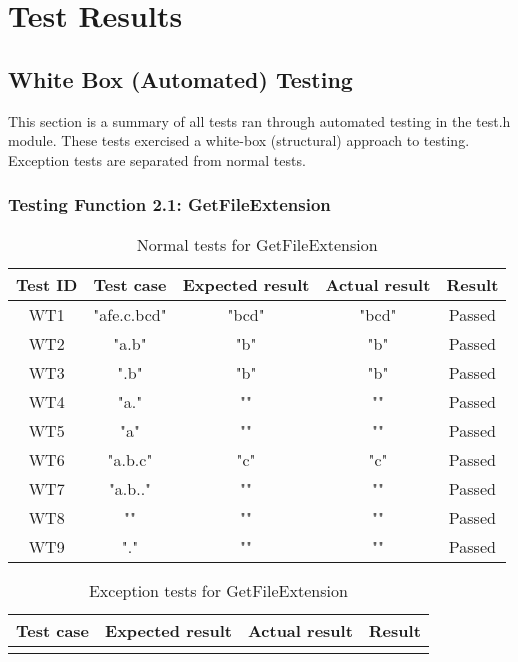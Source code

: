 \documentclass{article}
\begin{document}
\newpage

\section{Test Results}

\subsection{White Box (Automated) Testing }

This section is a summary of all tests ran through automated testing in the test.h module. These tests exercised a white-box (structural) approach to testing. Exception tests are separated from normal tests.

\subsubsection{Testing Function 2.1: GetFileExtension}
\begin{table}[H]
    \caption{Normal tests for GetFileExtension}
    \label{tab:wb}
    \centering
    \begin{tabular}{|c|c|c|c||c|}
        \hline
        \textbf{Test ID} & \textbf{Test case} & \textbf{Expected result} & \textbf{Actual result} & \textbf{Result}\\
        \hline
        WT1 & "afe.c.bcd" & "bcd" & "bcd" & Passed \\
        \hline
        WT2 & "a.b" & "b" & "b" & Passed \\
        \hline
        WT3 & ".b" & "b" & "b" & Passed \\
        \hline
        WT4 & "a." & "" & "" & Passed \\
        \hline
        WT5 & "a" & "" & "" & Passed \\
        \hline
        WT6 & "a.b.c" & "c" & "c" & Passed \\
        \hline
        WT7 & "a.b.." & "" & "" & Passed \\
        \hline
        WT8 & "" & "" & "" & Passed \\
        \hline
        WT9 & "." & "" & "" & Passed \\
        \hline
    \end{tabular}
\end{table}
\begin{table}[H]
    \caption{Exception tests for GetFileExtension}
    \label{tab:wb}
    \centering
    \begin{tabular}{|c|c|c||c|}
        \hline
        \textbf{Test case} & \textbf{Expected result} & \textbf{Actual result} & \textbf{Result}\\
        \hline
         &  &  &  \\
        \hline
    \end{tabular}
\end{table}
\end{document}
